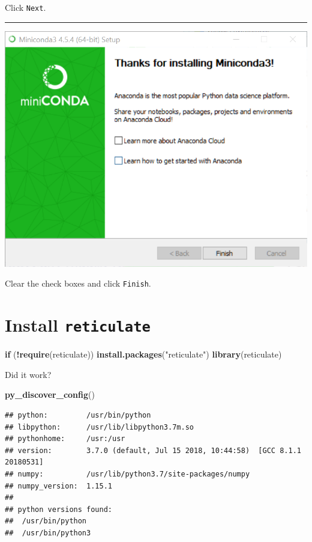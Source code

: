 \documentclass[]{book}
\newenvironment{Shaded}{\begin{snugshade}}{\end{snugshade}}
\newcommand{\ControlFlowTok}[1]{\textcolor[rgb]{0.13,0.29,0.53}{\textbf{#1}}}
\newcommand{\KeywordTok}[1]{\textcolor[rgb]{0.13,0.29,0.53}{\textbf{#1}}}
\newcommand{\NormalTok}[1]{#1}
\newcommand{\OperatorTok}[1]{\textcolor[rgb]{0.81,0.36,0.00}{\textbf{#1}}}
\newcommand{\StringTok}[1]{\textcolor[rgb]{0.31,0.60,0.02}{#1}}
\theoremstyle{definition}
\theoremstyle{definition}
\theoremstyle{definition}
\theoremstyle{remark}
\begin{document}
Click \texttt{Next}.

\begin{center}\rule{0.5\linewidth}{\linethickness}\end{center}

\begin{center}\includegraphics[width=0.9\linewidth]{screenshots/2018-08-31_16_21_44-Miniconda3_4.5.4_(64-bit)_Setup} \end{center}

Clear the check boxes and click \texttt{Finish}.

\hypertarget{install-reticulate}{%
\section{\texorpdfstring{Install
\texttt{reticulate}}{Install reticulate}}\label{install-reticulate}}

\begin{Shaded}
\begin{Highlighting}[]
\ControlFlowTok{if}\NormalTok{ (}\OperatorTok{!}\KeywordTok{require}\NormalTok{(reticulate)) }\KeywordTok{install.packages}\NormalTok{(}\StringTok{"reticulate"}\NormalTok{)}
\KeywordTok{library}\NormalTok{(reticulate)}
\end{Highlighting}
\end{Shaded}

Did it work?

\begin{Shaded}
\begin{Highlighting}[]
\KeywordTok{py_discover_config}\NormalTok{()}
\end{Highlighting}
\end{Shaded}

\begin{verbatim}
## python:         /usr/bin/python
## libpython:      /usr/lib/libpython3.7m.so
## pythonhome:     /usr:/usr
## version:        3.7.0 (default, Jul 15 2018, 10:44:58)  [GCC 8.1.1 20180531]
## numpy:          /usr/lib/python3.7/site-packages/numpy
## numpy_version:  1.15.1
## 
## python versions found: 
##  /usr/bin/python
##  /usr/bin/python3
\end{verbatim}


\end{document}
